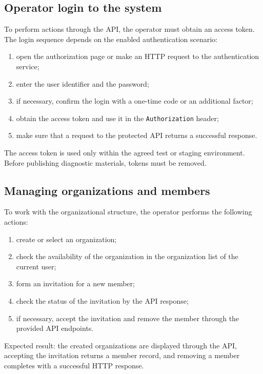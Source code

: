 \documentclass[12pt,a4paper]{extarticle}
\begin{document}
\subsection{Operator login to the system}

\begin{hseExample}
To perform actions through the API, the operator must obtain an access token. The login sequence depends on the enabled authentication scenario:

\begin{enumerate}[label=\arabic*), leftmargin=1.25cm]
    \item open the authorization page or make an HTTP request to the authentication service;
    \item enter the user identifier and the password;
    \item if necessary, confirm the login with a one-time code or an additional factor;
    \item obtain the access token and use it in the \texttt{Authorization} header;
    \item make sure that a request to the protected API returns a successful response.
\end{enumerate}

The access token is used only within the agreed test or staging environment. Before publishing diagnostic materials, tokens must be removed.
\end{hseExample}

\subsection{Managing organizations and members}

\begin{hseExample}
To work with the organizational structure, the operator performs the following actions:

\begin{enumerate}[label=\arabic*), leftmargin=1.25cm]
    \item create or select an organization;
    \item check the availability of the organization in the organization list of the current user;
    \item form an invitation for a new member;
    \item check the status of the invitation by the API response;
    \item if necessary, accept the invitation and remove the member through the provided API endpoints.
\end{enumerate}

Expected result: the created organizations are displayed through the API, accepting the invitation returns a member record, and removing a member completes with a successful HTTP response.
\end{hseExample}
\end{document}
